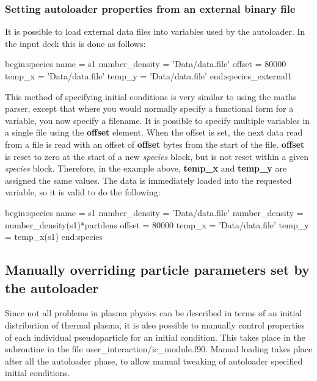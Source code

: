 \subsubsection{Setting autoloader properties from an external binary file}
It is possible to load external data files into variables used by the
autoloader. In the input deck this is done as follows:
\begin{boxverbatim}
begin:species
   name = s1
   number_density = 'Data/data.file'
   offset = 80000
   temp_x = 'Data/data.file'
   temp_y = 'Data/data.file'
end:species_external1
\end{boxverbatim}

This method of specifying initial conditions is very similar to using the
maths parser, except that
where you would normally specify a functional form for a variable, you now
specify a filename.  It is possible to specify
multiple variables in a single file using the {\bf offset} element. When the
offset is set, the next data read from a file is read with an offset of {\bf
offset} bytes from the start of the file. {\bf offset} is reset to zero at the
start of a new {\it species} block, but is not reset within a given
{\it species} block. Therefore, in the example above, {\bf temp\_x}
and {\bf temp\_y} are assigned the same values. The data is immediately loaded
into the requested variable, so it is valid to do the following:
\begin{boxverbatim}
begin:species
   name = s1
   number_density = 'Data/data.file'
   number_density = number_density(s1)*partdens
   offset = 80000
   temp_x = 'Data/data.file'
   temp_y = temp_x(s1)
end:species
\end{boxverbatim}


\subsection{Manually overriding particle parameters set by the autoloader}
\label{sec:manualload}

Since not all problems in plasma physics can be described in terms of an
initial distribution of thermal plasma, it is also possible to manually
control properties of each individual pseudoparticle for an initial
condition. This takes place in the subroutine  in the
file user\_interaction/ic\_module.f90. Manual loading takes place after
all the autoloader phase, to allow manual tweaking of autoloader specified
initial conditions.

